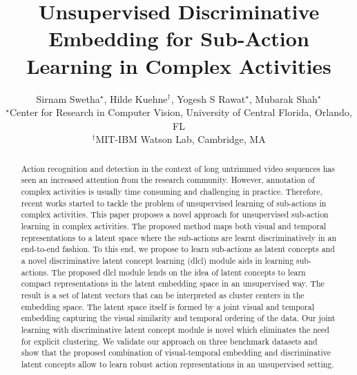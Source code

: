 \documentclass[final]{cvpr}
\begin{document}
\title{Unsupervised Discriminative Embedding for Sub-Action Learning in Complex Activities}

\author{Sirnam Swetha$^{\star}$, Hilde Kuehne$^{\dagger}$, Yogesh S Rawat$^{\star}$, Mubarak Shah$^{\star}$ \\
$^{\star}$Center for Research in Computer Vision, University of Central Florida, Orlando, FL\\
$^{\dagger}$MIT-IBM Watson Lab, Cambridge, MA\\
}

\maketitle

\begin{abstract}



Action recognition and detection in the context of long untrimmed video sequences has seen an increased attention from the research community. 
However, annotation of complex activities is usually time consuming and challenging in practice.
Therefore, recent works started to tackle the problem of unsupervised learning of sub-actions in complex activities.
This paper proposes a novel approach for unsupervised sub-action learning in complex activities.
The proposed method maps both visual and temporal representations to a latent space where the sub-actions are learnt discriminatively in an end-to-end fashion. 
To this end, we propose to learn sub-actions as latent concepts and a novel discriminative latent concept learning {\sc (dlcl)} module aids in learning sub-actions.
The proposed {\sc dlcl} module lends on the idea of latent concepts to learn compact representations in the latent embedding space in an unsupervised way. 
The result is a set of latent vectors that can be interpreted as cluster centers in the embedding space.
The latent space itself is formed by a joint visual and temporal embedding capturing the visual similarity and temporal ordering of the data. 
Our joint learning with discriminative latent concept module is novel which eliminates the need for explicit clustering.
We validate our approach on three benchmark datasets and show that the proposed combination of visual-temporal embedding and discriminative latent concepts allow to learn robust action representations in an unsupervised setting.


\end{abstract}

\vspace{-0.6cm}
\end{document}
